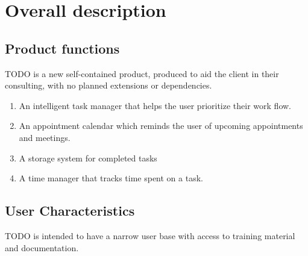 \documentclass[12pt,a4paper]{article}
\begin{document}
\section{Overall description}
\subsection{Product functions}
TODO is a new self-contained product, produced to aid the client in their consulting, with no planned extensions or dependencies.
\begin{enumerate}
\item An intelligent task manager that helps the user prioritize their work flow.
\item An appointment calendar which reminds the user of upcoming appointments and meetings.
\item A storage system for completed tasks
\item A time manager that tracks time spent on a task.
\end{enumerate}
\begin{comment}

Ethan listed many things here, reconcile the list, it contradict Blakes (my) list in some ways. Ethans contribution included below\\
\begin{verbatim}
2.2.1: List must be able to store and edit the following fields of information
2.2.1.1: Task Description
2.2.1.2: Project name
2.2.1.3: Due date
2.2.1.4: Estimation of how long to complete
2.2.1.5: Later additions by the user allowed.
2.2.2: Must maintain all tasks no longer active
2.2.3: Must provide interactions
2.2.3.1: Must have "working on top TODO item" button 
2.2.3.2: Button will add time to accumulated time worked on the item until disabled
2.2.3.3: Estimated time for the item must be reduced by the accumulated time worked
2.2.4: Priority of any item must be modifiable by the client
2.2.4.1: Including setting the priority of any item to highest
2.2.4.2: Such modifications need to rearrange the TODO list.
2.2.5: Appointment are to be stored as items
2.2.5.1: Priority of appointments needs to slowly increase
2.2.5.2: Has a reminder time at which point the appointment will have highest priority
2.2.6: Must maintain a simplistic hierarchical task completion functionality
\end{verbatim}
\end{comment}

\subsection{User Characteristics}
TODO is intended to have a narrow user base with access to training material and documentation. 
\end{document}
